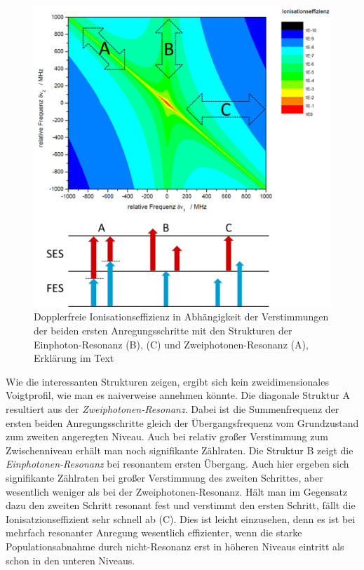\begin{figure}[H]
	\centering
	\includegraphics[width=15cm]{gfx/2d-laserscan_theorie_schumann.png}
	\caption{Dopplerfreie
	Ionisationseffizienz in Abhängigkeit
	der Verstimmungen der beiden ersten
	Anregungsschritte mit den Strukturen
	der Einphoton-Resonanz (B), (C) und
	Zweiphotonen-Resonanz (A),
	Erklärung im Text}\label{fig:2D-laserscan_theorie_schumann}
\end{figure}
Wie die interessanten Strukturen zeigen, ergibt sich kein zweidimensionales
Voigtprofil, wie man es naiverweise annehmen könnte. Die diagonale Struktur A
resultiert aus der \textit{Zweiphotonen-Resonanz}. Dabei ist die Summenfrequenz
der ersten beiden Anregungsschritte gleich der Übergangsfrequenz vom
Grundzustand zum zweiten angeregten Niveau. Auch bei relativ großer Verstimmung
zum Zwischenniveau erhält man noch signifikante Zählraten. Die Struktur B
zeigt die \textit{Einphotonen-Resonanz} bei resonantem ersten Übergang. Auch
hier ergeben sich signifikante Zählraten bei großer Verstimmung des zweiten Schrittes, aber
wesentlich weniger als bei der Zweiphotonen-Resonanz. Hält man im Gegensatz dazu
den zweiten Schritt resonant fest und verstimmt den ersten Schritt, fällt die
Ionisatzionseffizient sehr schnell ab (C). Dies ist leicht einzusehen, denn es
ist bei mehrfach resonanter Anregung wesentlich effizienter, wenn die starke
Populationsabnahme durch nicht-Resonanz erst in höheren Niveaus eintritt als
schon in den unteren Niveaus.

